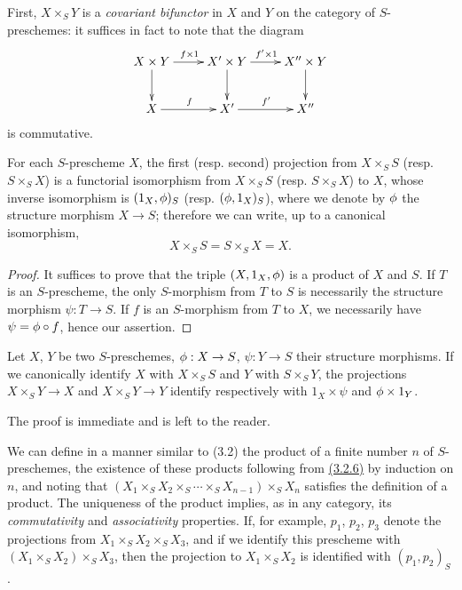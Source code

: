 \begin{env}[3.3.2]
\label{env-1.3.3.2}
First, $X\times_S Y$ is a {\em covariant bifunctor} in $X$ and $Y$ on the
category of $S$-preschemes: it suffices in fact to note that the diagram
\[
  \xymatrix{
    X\times Y\ar[r]^{f\times 1}\ar[d] &
    X'\times Y\ar[r]^{f'\times 1}\ar[d] &
    X''\times Y\ar[d]\\
    X\ar[r]^f &
    X'\ar[r]^{f'} &
    X''
  }
\]
is commutative.
\end{env}

\begin{prop}[3.3.3]
\label{prop-1.3.3.3}
For each $S$-prescheme $X$, the first (resp. second) projection from
$X\times_S S$ (resp. $S\times_S X$) is a functorial isomorphism from
$X\times_S S$ (resp. $S\times_S X$) to $X$, whose inverse isomorphism is
$(1_X,\phi)_S$ (resp. $(\phi,1_X)_S$), where we denote by $\phi$ the
structure morphism $X\to S$; therefore we can write, up to a canonical
isomorphism,
\[
  X\times_S S=S\times_S X=X.
\]
\end{prop}

\begin{proof}
\label{proof-prop-1.3.3.3}
It suffices to prove that the triple $(X,1_X,\phi)$ is a product of $X$ and
$S$. If $T$ is an $S$-prescheme, the only $S$-morphism from $T$ to $S$ is
necessarily the structure morphism $\psi:T\to S$. If $f$ is an $S$-morphism from
$T$ to $X$, we necessarily have $\psi=\phi\circ f$, hence our assertion.
\end{proof}

\begin{cor}[3.3.4]
\label{cor-1.3.3.4}
Let $X$, $Y$ be two $S$-preschemes, $\phi:X\to S$, $\psi:Y\to S$ their
structure morphisms. If we canonically identify $X$ with $X\times_S S$ and $Y$
with $S\times_S Y$, the projections $X\times_S Y\to X$ and $X\times_S Y\to Y$
identify respectively with $1_X\times\psi$ and $\phi\times 1_Y$.
\end{cor}

The proof is immediate and is left to the reader.

\begin{env}[3.3.5]
\label{env-1.3.3.5}
We can define in a manner similar to (3.2) the product of a
finite number $n$ of $S$-preschemes, the existence of these products following
from \hyperref[thm-1.3.2.6]{(3.2.6)} by induction on $n$, and noting that
$(X_1\times_S X_2\times_S\cdots\times_S X_{n-1})\times_S X_n$ satisfies the
definition of a product. The uniqueness of the product implies, as in any
category, its {\em commutativity} and {\em associativity} properties. If, for
example, $p_1$, $p_2$, $p_3$ denote the projections from
$X_1\times_S X_2\times_S X_3$, and if we identify this prescheme with
$(X_1\times_S X_2)\times_S X_3$, then the projection to $X_1\times_S X_2$ is
identified with $(p_1,p_2)_S$.
\end{env}

